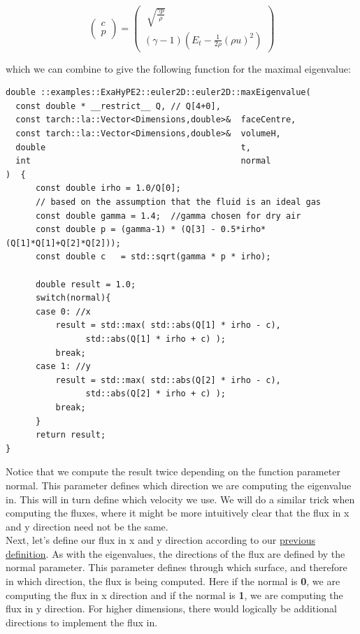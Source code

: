 \documentclass[12pt,letterpaper]{article}
\begin{document}
\begin{equation*}
    \left(
    \begin{array}{lr} c \\
                      p
                      \end{array} \right) =
    \left(
    \begin{array}{lr} \sqrt[]{\frac{\gamma  p}{\rho}} \\
                      (\gamma - 1) ( E_t - \frac{1}{2 \rho} (\rho u)^2 ) 
                      \end{array} \right)
\end{equation*}

which we can combine to give the following function for the maximal eigenvalue:

\begin{lstlisting}[style = C++]
double ::examples::ExaHyPE2::euler2D::euler2D::maxEigenvalue(
  const double * __restrict__ Q, // Q[4+0],
  const tarch::la::Vector<Dimensions,double>&  faceCentre,
  const tarch::la::Vector<Dimensions,double>&  volumeH,
  double                                       t,
  int                                          normal
)  {
	  const double irho = 1.0/Q[0];
	  // based on the assumption that the fluid is an ideal gas
	  const double gamma = 1.4;  //gamma chosen for dry air
	  const double p = (gamma-1) * (Q[3] - 0.5*irho*(Q[1]*Q[1]+Q[2]*Q[2]));
	  const double c   = std::sqrt(gamma * p * irho);

	  double result = 1.0;
	  switch(normal){
	  case 0: //x
		  result = std::max( std::abs(Q[1] * irho - c),
		        std::abs(Q[1] * irho + c) );
		  break;
	  case 1: //y
		  result = std::max( std::abs(Q[2] * irho - c),
		        std::abs(Q[2] * irho + c) );
		  break;
	  }
	  return result;
}
\end{lstlisting}

Notice that we compute the result twice depending on the function parameter normal. This parameter defines which direction we are computing the eigenvalue in. This will in turn define which velocity we use. We will do a similar trick when computing the fluxes, where it might be more intuitively clear that the flux in x and y direction need not be the same. \\

Next, let's define our flux in x and y direction according to our \hyperref[Euler_equation]{previous definition}.
As with the eigenvalues, the directions of the flux are defined by the normal parameter. This parameter defines through which surface, and therefore in which direction, the flux is being computed. Here if the normal is \textbf{0}, we are computing the flux in x direction and if the normal is \textbf{1}, we are computing the flux in y direction. For higher dimensions, there would logically be additional directions to implement the flux in.
\end{document}
